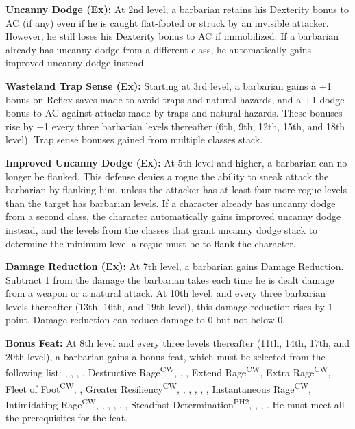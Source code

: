 \textbf{Uncanny Dodge (Ex):} At 2nd level, a barbarian retains his Dexterity bonus to AC (if any) even if he is caught flat-footed or struck by an invisible attacker. However, he still loses his Dexterity bonus to AC if immobilized. If a barbarian already has uncanny dodge from a different class, he automatically gains improved uncanny dodge instead.

\textbf{Wasteland Trap Sense (Ex):} Starting at 3rd level, a barbarian gains a +1 bonus on Reflex saves made to avoid traps and natural hazards, and a +1 dodge bonus to AC against attacks made by traps and natural hazards. These bonuses rise by +1 every three barbarian levels thereafter (6th, 9th, 12th, 15th, and 18th level). Trap sense bonuses gained from multiple classes stack.

\textbf{Improved Uncanny Dodge (Ex):} At 5th level and higher, a barbarian can no longer be flanked. This defense denies a rogue the ability to sneak attack the barbarian by flanking him, unless the attacker has at least four more rogue levels than the target has barbarian levels. If a character already has uncanny dodge from a second class, the character automatically gains improved uncanny dodge instead, and the levels from the classes that grant uncanny dodge stack to determine the minimum level a rogue must be to flank the character.

\textbf{Damage Reduction (Ex):} At 7th level, a barbarian gains Damage Reduction. Subtract 1 from the damage the barbarian takes each time he is dealt damage from a weapon or a natural attack. At 10th level, and every three barbarian levels thereafter (13th, 16th, and 19th level), this damage reduction rises by 1 point. Damage reduction can reduce damage to 0 but not below 0.

\textbf{Bonus Feat:} At 8th level and every three levels thereafter (11th, 14th, 17th, and 20th level), a barbarian gains a bonus feat, which must be selected from the following list:
,
,
,
,
Destructive Rage\textsuperscript{CW},
,
,
Extend Rage\textsuperscript{CW},
Extra Rage\textsuperscript{CW},
Fleet of Foot\textsuperscript{CW},
,
Greater Resiliency\textsuperscript{CW},
,
,
,
,
,
Instantaneous Rage\textsuperscript{CW},
Intimidating Rage\textsuperscript{CW},
,
,
,
,
,
Steadfast Determination\textsuperscript{PH2},
,
,
.
He must meet all the prerequisites for the feat.

